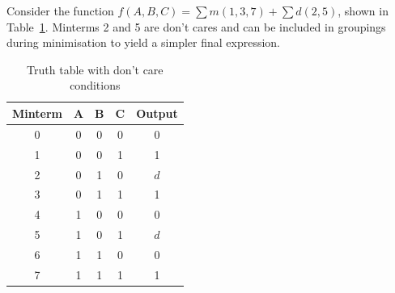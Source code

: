 Consider the function \(f(A,B,C) = \sum m(1,3,7) + \sum d(2,5)\), shown
in Table~\ref{tab:dontcare}. Minterms 2 and 5 are don't cares and can be
included in groupings during minimisation to yield a simpler final
expression.

\begin{table}[H]
\centering
\caption{Truth table with don't care conditions}
\label{tab:dontcare}
\begin{tabular}{@{}ccccc@{}}
\toprule
\textbf{Minterm} & \textbf{A} & \textbf{B} & \textbf{C} &
\textbf{Output} \\
\midrule
0 & 0 & 0 & 0 & 0 \\
1 & 0 & 0 & 1 & 1 \\
2 & 0 & 1 & 0 & \(d\) \\
3 & 0 & 1 & 1 & 1 \\
4 & 1 & 0 & 0 & 0 \\
5 & 1 & 0 & 1 & \(d\) \\
6 & 1 & 1 & 0 & 0 \\
7 & 1 & 1 & 1 & 1 \\
\bottomrule
\end{tabular}
\end{table}

